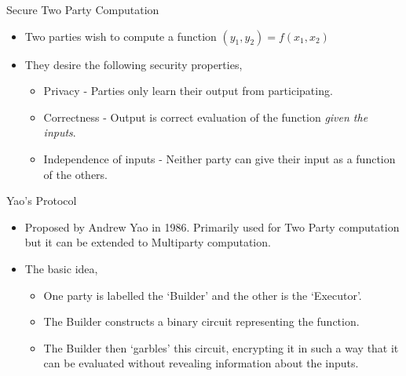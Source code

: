 \documentclass[t, 12pt]{beamer}            %
\begin{document}
\begin{frame}{Secure Two Party Computation}
	\begin{itemize} %
		\item Two parties wish to compute a function $(y_1, y_2) = f(x_1, x_2)$
		\item They desire the following security properties,
		\begin{itemize}
			\item Privacy - Parties only learn their output from participating.
			\item Correctness - Output is correct evaluation of the function \emph{given the inputs}.
			\item Independence of inputs - Neither party can give their input as a function of the others.
		\end{itemize}
	\end{itemize}
\end{frame}

\begin{frame}{Yao's Protocol}
	\begin{itemize} %
		\item Proposed by Andrew Yao in 1986. Primarily used for Two Party computation but it can be extended to Multiparty computation.
		\item  The basic idea,
		\begin{itemize}
			\item One party is labelled the `Builder' and the other is the `Executor'.
			\item The Builder constructs a binary circuit representing the function.
			\item The Builder then `garbles' this circuit, encrypting it in such a way that it can be evaluated without revealing information about the inputs.%
		\end{itemize}
	\end{itemize}
\end{frame}
\end{document}
